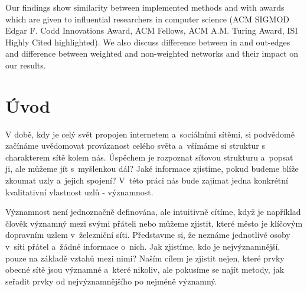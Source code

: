 \documentclass{bakalarka}
\begin{document}
Our findings show similarity between implemented methods and with awards which
are given to influential researchers in computer science (ACM SIGMOD Edgar F.
Codd Innovations Award, ACM Fellows, ACM A.M. Turing Award, ISI Highly Cited
highlighted). We also discuss difference between in and out-edges and difference
between weighted and non-weighted networks and their impact on our results.





\clearpage
\pagestyle{empty}
\setlength{\cftbeforetoctitleskip}{-2em}
\tableofcontents

\clearpage
\setcounter{page}{1}
\pagestyle{fancy}
\chapter{Úvod}
V době, kdy je celý svět propojen internetem a~sociálními sítěmi, si podvědomě
začínáme uvědomovat provázanost celého světa a~všímáme si struktur s
charakterem sítě kolem nás. Úspěchem je rozpoznat síťovou strukturu a~popsat
ji, ale můžeme jít s~myšlenkou dál? Jaké informace zjistíme, pokud budeme blíže
zkoumat uzly a~jejich spojení? V~této práci nás bude zajímat jedna konkrétní
kvalitativní vlastnost uzlů - významnost.

Významnost není jednoznačně definována, ale intuitivně cítíme, když je
například člověk významný mezi svými přáteli nebo můžeme zjistit, které město
je klíčovým dopravním uzlem v~železniční síti.  Představme si, že neznáme
jednotlivé osoby v~síti přátel a~žádné informace o~nich. Jak zjistíme, kdo je
nejvýznamnější, pouze na základě vztahů mezi nimi? Naším cílem je zjistit nejen,
které prvky obecné sítě jsou významné a~které nikoliv, ale pokusíme se najít
metody, jak seřadit prvky od nejvýznamnějšího po nejméně významný.
\end{document}
